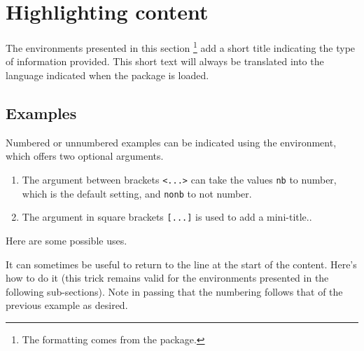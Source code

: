 \documentclass[10pt, a4paper]{article}
\begin{document}
\section{Highlighting content}

\begin{tdocnote}    
    The environments presented in this section
    \footnote{
        The formatting comes from the  package.
    }
    add a short title indicating the type of information provided.
    This short text will always be translated into the language indicated when the  package is loaded.
\end{tdocnote}




\subsection{Examples}

Numbered or unnumbered examples can be indicated using the  environment, which offers two optional arguments.

\begin{enumerate}
    \item The  argument between brackets \verb#<...># can take the values \verb#nb# to number, which is the default setting, and \verb#nonb# to not number.

    \item The  argument in square brackets \verb#[...]# is used to add a mini-title..
\end{enumerate}


Here are some possible uses.









\begin{tdoctip}    
    It can sometimes be useful to return to the line at the start of the content. Here's how to do it (this trick remains valid for the environments presented in the following sub-sections). Note in passing that the numbering follows that of the previous example as desired.

\end{tdoctip}
\end{document}
